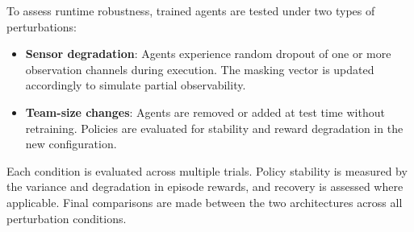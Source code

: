 \documentclass{article}
\begin{document}
To assess runtime robustness, trained agents are tested under two types of perturbations:

\begin{itemize}
    \item \textbf{Sensor degradation}: Agents experience random dropout 
        of one or more observation channels during execution. 
        The masking vector is updated accordingly to simulate partial observability.
    \item \textbf{Team-size changes}: Agents are removed or added at test 
        time without retraining. Policies are evaluated for stability and 
        reward degradation in the new configuration.
\end{itemize}

Each condition is evaluated across multiple trials. 
Policy stability is measured by the variance and degradation in episode rewards, 
and recovery is assessed where applicable. 
Final comparisons are made between the two architectures across all perturbation conditions.



\printbibliography
\end{document}

